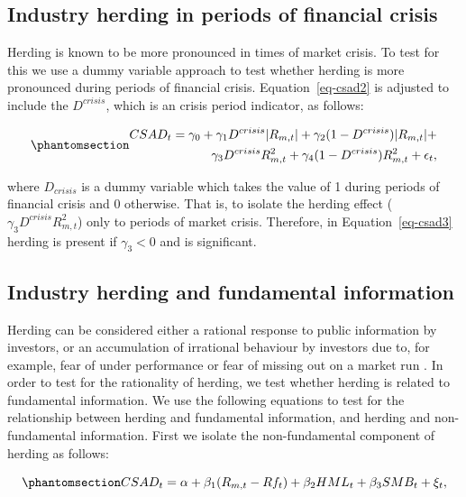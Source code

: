 \documentclass[
  letterpaper,
  DIV=11,
  numbers=noendperiod]{scrartcl}
\begin{document}
\subsection{Industry herding in periods of financial
crisis}\label{industry-herding-in-periods-of-financial-crisis}

Herding is known to be more pronounced in times of market crisis. To
test for this we use a dummy variable approach to test whether herding
is more pronounced during periods of financial crisis.
Equation~\ref{eq-csad2} is adjusted to include the \(D^{crisis}\), which
is an crisis period indicator, as follows:

\begin{equation}\phantomsection\label{eq-csad3}{
\begin{aligned}
CSAD_{t} = \gamma_0 +  \gamma_1D^{crisis}|R_{m, t}| + \gamma_2(1 - D^{crisis})|R_{m,t}| + \\  \gamma_3D^{crisis}R_{m, t}^2 + \gamma_4(1-D^{crisis})R_{m,t}^2 + \epsilon_{t},
\end{aligned}
}\end{equation}

where \(D_{crisis}\) is a dummy variable which takes the value of 1
during periods of financial crisis and 0 otherwise. That is, to isolate
the herding effect (\(\gamma_3D^{crisis}R_{m, t}^2\)) only to periods of
market crisis. Therefore, in Equation~\ref{eq-csad3} herding is present
if \(\gamma_3 < 0\) and is significant.

\subsection{Industry herding and fundamental
information}\label{industry-herding-and-fundamental-information}

Herding can be considered either a rational response to public
information by investors, or an accumulation of irrational behaviour by
investors due to, for example, fear of under performance or fear of
missing out on a market run \citep[see][]{Bikhchandani2001}. In order to
test for the rationality of herding, we test whether herding is related
to fundamental information. We use the following equations to test for
the relationship between herding and fundamental information, and
herding and non-fundamental information. First we isolate the
non-fundamental component of herding as follows:

\begin{equation}\phantomsection\label{eq-info}{CSAD_t = \alpha + \beta_1(R_{m,t} - Rf_t) + \beta_2HML_t + \beta_3SMB_t + \xi_t,}\end{equation}
\end{document}

